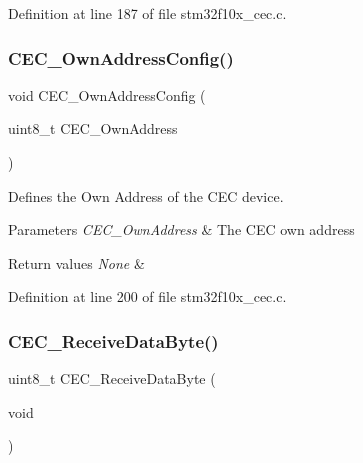 Definition at line 187 of file stm32f10x\+\_\+cec.\+c.

\mbox{\label{group___c_e_c___private___functions_gacad422ef1f50246b2021b41835b8a95c}} 
\subsubsection{\texorpdfstring{C\+E\+C\+\_\+\+Own\+Address\+Config()}{CEC\_OwnAddressConfig()}}
{\footnotesize\ttfamily void C\+E\+C\+\_\+\+Own\+Address\+Config (\begin{DoxyParamCaption}\item[{uint8\+\_\+t}]{C\+E\+C\+\_\+\+Own\+Address }\end{DoxyParamCaption})}



Defines the Own Address of the C\+EC device. 


\begin{DoxyParams}{Parameters}
{\em C\+E\+C\+\_\+\+Own\+Address} & The C\+EC own address \\
\hline
\end{DoxyParams}

\begin{DoxyRetVals}{Return values}
{\em None} & \\
\hline
\end{DoxyRetVals}


Definition at line 200 of file stm32f10x\+\_\+cec.\+c.

\mbox{\label{group___c_e_c___private___functions_ga165837bff6292e7674eff6f8b230da97}} 
\subsubsection{\texorpdfstring{C\+E\+C\+\_\+\+Receive\+Data\+Byte()}{CEC\_ReceiveDataByte()}}
{\footnotesize\ttfamily uint8\+\_\+t C\+E\+C\+\_\+\+Receive\+Data\+Byte (\begin{DoxyParamCaption}\item[{void}]{ }\end{DoxyParamCaption})}



